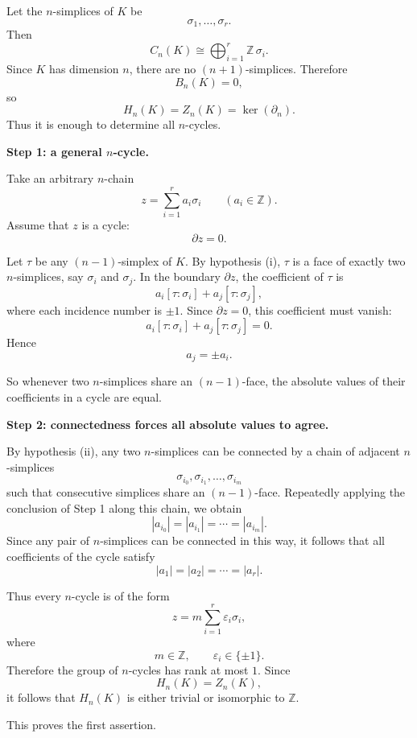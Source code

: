 \begin{solution}
Let the \(n\)-simplices of \(K\) be
\[
\sigma_1,\dots,\sigma_r.
\]
Then
\[
C_n(K)\cong \bigoplus_{i=1}^r \mathbb Z\,\sigma_i.
\]
Since \(K\) has dimension \(n\), there are no \((n+1)\)-simplices. Therefore
\[
B_n(K)=0,
\]
so
\[
H_n(K)=Z_n(K)=\ker(\partial_n).
\]
Thus it is enough to determine all \(n\)-cycles.

\par

\textbf{Step 1: a general \(n\)-cycle.}

Take an arbitrary \(n\)-chain
\[
z=\sum_{i=1}^r a_i\sigma_i
\qquad (a_i\in \mathbb Z).
\]
Assume that \(z\) is a cycle:
\[
\partial z=0.
\]

Let \(\tau\) be any \((n-1)\)-simplex of \(K\). By hypothesis (i), \(\tau\) is a face of exactly two \(n\)-simplices, say \(\sigma_i\) and \(\sigma_j\). In the boundary \(\partial z\), the coefficient of \(\tau\) is
\[
a_i[\tau:\sigma_i] + a_j[\tau:\sigma_j],
\]
where each incidence number is \(\pm 1\). Since \(\partial z=0\), this coefficient must vanish:
\[
a_i[\tau:\sigma_i] + a_j[\tau:\sigma_j]=0.
\]
Hence
\[
a_j=\pm a_i.
\]

So whenever two \(n\)-simplices share an \((n-1)\)-face, the absolute values of their coefficients in a cycle are equal.

\par

\textbf{Step 2: connectedness forces all absolute values to agree.}

By hypothesis (ii), any two \(n\)-simplices can be connected by a chain of adjacent \(n\)-simplices
\[
\sigma_{i_0},\sigma_{i_1},\dots,\sigma_{i_m}
\]
such that consecutive simplices share an \((n-1)\)-face. Repeatedly applying the conclusion of Step 1 along this chain, we obtain
\[
|a_{i_0}|=|a_{i_1}|=\cdots=|a_{i_m}|.
\]
Since any pair of \(n\)-simplices can be connected in this way, it follows that all coefficients of the cycle satisfy
\[
|a_1|=|a_2|=\cdots=|a_r|.
\]

Thus every \(n\)-cycle is of the form
\[
z=m\sum_{i=1}^r \varepsilon_i \sigma_i,
\]
where
\[
m\in \mathbb Z,
\qquad
\varepsilon_i\in \{\pm 1\}.
\]
Therefore the group of \(n\)-cycles has rank at most \(1\). Since
\[
H_n(K)=Z_n(K),
\]
it follows that \(H_n(K)\) is either trivial or isomorphic to \(\mathbb Z\).

This proves the first assertion.

\par


\end{solution}
